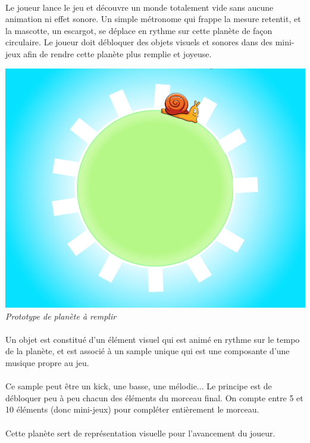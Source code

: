 \documentclass[a4paper,11pt]{article}
\begin{document}
\paragraph{} Le joueur lance le jeu et découvre un monde totalement vide sans aucune animation ni effet sonore. Un simple métronome qui frappe la mesure retentit, et la mascotte, un escargot, se déplace en rythme sur cette planète de façon circulaire.
Le joueur doit débloquer des objets visuels et sonores dans des mini-jeux afin de rendre cette planète plus remplie et joyeuse.
\begin{center}
\includegraphics[scale=0.4]{protoPlanete.png}\\
\textit{Prototype de planète à remplir}
\end{center}
\paragraph{} Un objet est constitué d’un élément visuel qui est animé en rythme sur le tempo de la planète, et est associé à un sample unique qui est une composante d’une musique propre au jeu.\
\paragraph{}Ce sample peut être un kick, une basse, une mélodie... Le principe est de débloquer peu à peu chacun des éléments du morceau final. On compte entre 5 et 10 éléments (donc mini-jeux) pour compléter entièrement le morceau.
\paragraph{}Cette planète sert de représentation visuelle pour l’avancement du joueur.
\end{document}
